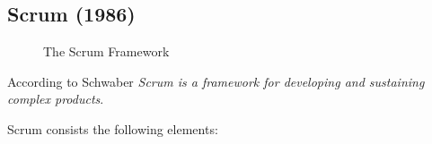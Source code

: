 \subsection{Scrum (1986)}
\begin{figure}
 \caption{The Scrum Framework\cite{scrum2013scrum}}
 \centering 
\end{figure}

According to Schwaber\cite{schwaber2011scrum} \emph{Scrum is a framework for developing and sustaining complex products}.\cite{schwaber2011scrum}

Scrum consists the following elements:


